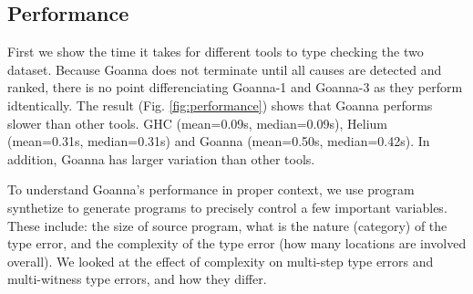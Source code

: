 \documentclass[pdflatex,sn-mathphys-num]{sn-jnl}%
\begin{document}



    \subsection{Performance} \label{sub:eval-performacne}
    First we show the time it takes for different tools to type checking the two dataset. Because Goanna does not terminate until all causes are detected and ranked, there is no point differenciating Goanna-1 and Goanna-3 as they perform idtentically. The result (Fig. \ref{fig:performance}) shows that Goanna performs slower than other tools. GHC (mean=0.09s, median=0.09s), Helium (mean=0.31s, median=0.31s) and Goanna (mean=0.50s, median=0.42s). In addition, Goanna has larger variation than other tools.

    To understand Goanna's performance in proper context, we use program synthetize to generate programs to precisely control a few important variables.  These include: the size of source program, what is the nature (category) of the type error, and the complexity of the type error (how many locations are involved overall).  We looked at the effect of complexity on multi-step type errors and multi-witness type errors, and how they differ. 
\end{document}
